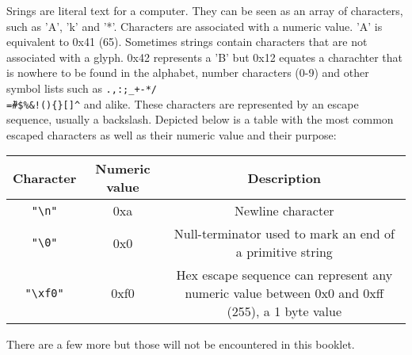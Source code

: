 Srings are literal text for a computer. They can be seen as an array of characters, such as 'A', 'k' and '*'. Characters are
associated with a numeric value. 'A' is equivalent to 0x41 (65). Sometimes strings contain characters that are not associated with a glyph. 0x42 represents a 'B' but 0x12 equates a charachter that is nowhere to be found in the alphabet, number characters (0-9) and other symbol lists such as \texttt{.,:;\_+-*/\\\~=\#\$\@\%\&!()\{\}[]\^} and alike. These characters are represented by an escape sequence, usually a backslash. Depicted below is a table with the most common escaped characters as well as their numeric value and their purpose:

\begin{tabular}{ | c | c | c |}
Character & Numeric value & Description \\
  \hline
 \texttt{"\textbackslash n"} & 0xa & Newline character \\
 \texttt{"\textbackslash 0"} & 0x0 & Null-terminator used to mark an end of a primitive string \\
 \texttt{"\textbackslash xf0"} &  0xf0 & Hex escape sequence can represent any numeric value between 0x0 and 0xff (255), a 1 byte value \\
\end{tabular}
There are a few more but those will not be encountered in this booklet.
